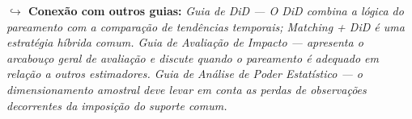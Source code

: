 \documentclass[12pt,a4paper]{article}
\begin{document}
\begin{conexaobox}
\textcolor{orangeframe}{\textbf{$\hookrightarrow$ Conexão com outros guias:}} \textit{Guia de DiD --- O DiD combina a lógica do pareamento com a comparação de tendências temporais; Matching + DiD é uma estratégia híbrida comum. Guia de Avaliação de Impacto --- apresenta o arcabouço geral de avaliação e discute quando o pareamento é adequado em relação a outros estimadores. Guia de Análise de Poder Estatístico --- o dimensionamento amostral deve levar em conta as perdas de observações decorrentes da imposição do suporte comum.}
\end{conexaobox}

\newpage

\end{document}
